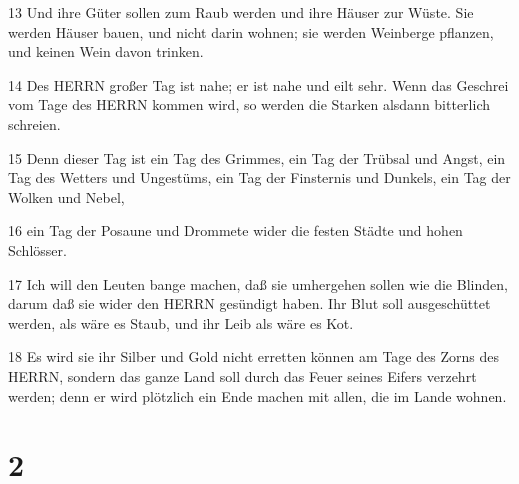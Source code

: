 \par 13 Und ihre Güter sollen zum Raub werden und ihre Häuser zur Wüste. Sie werden Häuser bauen, und nicht darin wohnen; sie werden Weinberge pflanzen, und keinen Wein davon trinken.
\par 14 Des HERRN großer Tag ist nahe; er ist nahe und eilt sehr. Wenn das Geschrei vom Tage des HERRN kommen wird, so werden die Starken alsdann bitterlich schreien.
\par 15 Denn dieser Tag ist ein Tag des Grimmes, ein Tag der Trübsal und Angst, ein Tag des Wetters und Ungestüms, ein Tag der Finsternis und Dunkels, ein Tag der Wolken und Nebel,
\par 16 ein Tag der Posaune und Drommete wider die festen Städte und hohen Schlösser.
\par 17 Ich will den Leuten bange machen, daß sie umhergehen sollen wie die Blinden, darum daß sie wider den HERRN gesündigt haben. Ihr Blut soll ausgeschüttet werden, als wäre es Staub, und ihr Leib als wäre es Kot.
\par 18 Es wird sie ihr Silber und Gold nicht erretten können am Tage des Zorns des HERRN, sondern das ganze Land soll durch das Feuer seines Eifers verzehrt werden; denn er wird plötzlich ein Ende machen mit allen, die im Lande wohnen.

\chapter{2}

